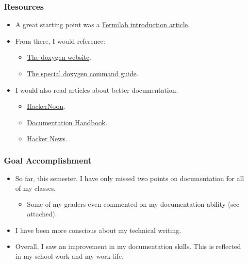 \documentclass[xclolor=dvipsnames]{beamer}            %
\begin{document}
\begin{darkframes}
    \begin{frame}
        \frametitle{Resources}

        \begin{itemize}
            \item A great starting point was a \href{http://www-numi.fnal.gov/offline_software/srt_public_context/WebDocs/doxygen-howto.html}{Fermilab introduction article}.

            \item From there, I would reference:
                \begin{itemize}
                    \item \href{https://www.stack.nl/~dimitri/doxygen/results.html}{The doxygen website}.
                    \item \href{https://www.stack.nl/~dimitri/doxygen/manual/commands.html}{The special doxygen command guide}.
                \end{itemize}

            \item I would also read articles about better documentation.
                \begin{itemize}
                    \item \href{https://hackernoon.com/write-good-documentation-6caffb9082b4}{HackerNoon}.
                    \item \href{https://github.com/jamiebuilds/documentation-handbook}{Documentation Handbook}.
                    \item \href{https://news.ycombinator.com/item?id=8414714}{Hacker News}.
                \end{itemize}

        \end{itemize}
    \end{frame}

    \begin{frame}
        \frametitle{Goal Accomplishment}

        \begin{itemize}
            \item So far, this semester, I have only missed two points on documentation for all of my classes.
            \begin{itemize}
                \item Some of my graders even commented on my documentation ability (see attached).
            \end{itemize}
            \item I have been more conscious about my technical writing.
            \item Overall, I saw an improvement in my documentation skills. This is reflected in my school work and my work life.
        \end{itemize}
    \end{frame}


\end{darkframes}
\end{document}
